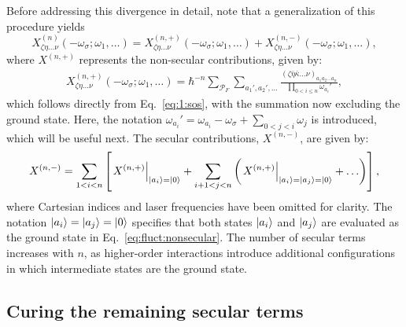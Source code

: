 \documentclass[12pt,a4paper]{article}
\begin{document}
Before addressing this divergence in detail, note that a generalization of this procedure yields \begin{equation}
	X^{(n)}_{\zeta \eta \ldots \nu}(-\omega_\sigma; \omega_1, \ldots)  = X^{(n,+)}_{\zeta \eta \ldots \nu}(-\omega_\sigma; \omega_1, \ldots)  + X^{(n,-)}_{\zeta \eta \ldots \nu}(-\omega_\sigma; \omega_1, \ldots) ,\label{eq:fluct}
\end{equation} where $X^{(n,+)}$ represents the non-secular contributions, given by:
\begin{align}
	X^{(n,+)}_{\zeta \eta \ldots \nu}(-\omega_\sigma; \omega_1, \ldots) = \hbar^{-n} \sum_{\mathcal{P}_F} \sum_{a_1', a_2', \ldots} \frac{(\zeta \bar{\eta} \bar{\kappa} \ldots \nu)_{a_1 a_2 \ldots a_n}}{\prod_{0 < i \leq n} \omega_{a_i}'} ,\label{eq:fluct:nonsecular}
\end{align}
which follows directly from Eq.~\eqref{eq:1:sos}, with the summation now excluding the ground state. Here, the notation $\omega_{a_i}' = \omega_{a_i} - \omega_\sigma + \sum_{0 < j < i} \omega_j$ is introduced, which will be useful next.
The secular contributions, $X^{(n,-)}$, are given by:
\begin{align}
	X^{(n,-)} = \sum_{1 < i < n} \left[ \left. X^{(n,+)} \right|_{\ket{a_i} = \ket{0}} + \sum_{i+1 < j < n} \left( \left. X^{(n,+)} \right|_{\ket{a_i} = \ket{a_j} = \ket{0}} + \ldots \right) \right],\label{eq:fluct:secular}
\end{align}
where Cartesian indices and laser frequencies have been omitted for clarity. The notation $\ket{a_i} = \ket{a_j} = \ket{0}$ specifies that both states $\ket{a_i}$ and $\ket{a_j}$ are evaluated as the ground state in Eq.~\eqref{eq:fluct:nonsecular}. The number of secular terms increases with $n$, as higher-order interactions introduce additional configurations in which intermediate states are the ground state. 

\subsection{Curing the remaining secular terms}
\end{document}
